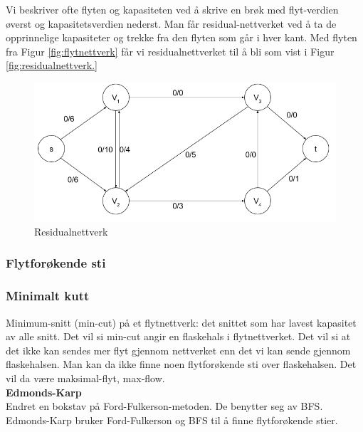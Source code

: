 \begin{boxed}
Vi beskriver ofte flyten og kapasiteten ved å skrive en brøk med flyt-verdien øverst og kapasitetsverdien nederst. Man får residual-nettverket ved å ta de opprinnelige kapasiteter og trekke fra den flyten som går i hver kant. Med flyten fra Figur \ref{fig:flytnettverk} får vi residualnettverket til å bli som vist i Figur \ref{fig:residualnettverk.}

\begin{figure}[H]
\includegraphics[scale=0.6]{images/residualnettverk}
\centering %
\caption{Residualnettverk}
\label{fig:residualnettverk}
\end{figure}
\end{boxed}

\subsubsection{Flytforøkende sti}
\subsubsection{Minimalt kutt}
Minimum-snitt (min-cut) på et flytnettverk: det snittet som har lavest kapasitet av alle snitt. Det vil si min-cut angir en flaskehals i flytnettverket. Det vil si at det ikke kan sendes mer flyt gjennom nettverket enn det vi kan sende gjennom flaskehalsen. Man kan da ikke finne noen flytforøkende sti over flaskehalsen. Det vil da være maksimal-flyt, max-flow.\\



\noindent \textbf{Edmonds-Karp}\\
Endret en bokstav på Ford-Fulkerson-metoden. De benytter seg av BFS. Edmonds-Karp bruker Ford-Fulkerson og BFS til å finne flytforøkende stier.\\

